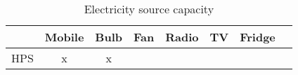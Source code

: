\begin{table}[htbp]\centering
\caption{Electricity source capacity}
\begin{tabular}{l*{7}{c}}
\toprule
                &     Mobile&      Bulb&     Fan & Radio & TV  & Fridge\\
\midrule
HPS             &  x &   x &   & & & \\

      
\bottomrule
\end{tabular}
\end{table}